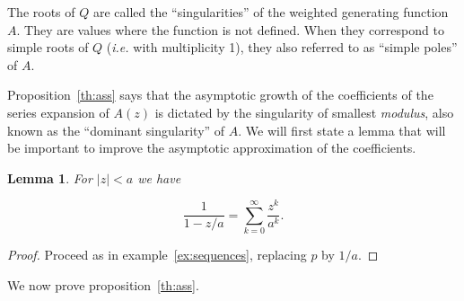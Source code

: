 \documentclass{article}
\newtheorem{lemma}{Lemma}
\begin{document}
The roots of $Q$ are called the ``singularities'' of the weighted
generating function $A$. They are values where the function is not
defined. When they correspond to simple roots of $Q$ (\textit{i.e.} with
multiplicity 1), they also referred to as ``simple poles'' of $A$.

Proposition~\ref{th:ass} says that the asymptotic growth of the
coefficients of the series expansion of $A(z)$ is dictated by the
singularity of smallest \textit{modulus}, also known as the ``dominant
singularity'' of $A$. We will first state a lemma that will be important
to improve the asymptotic approximation of the coefficients.

\begin{lemma}
\label{lemma:poles}
For $|z| < a$ we have

\begin{equation}
\label{eq:poles}
\frac{1}{1-z/a} = \sum_{k=0}^\infty \frac{z^k}{a^k}.
\end{equation}
\end{lemma}

\begin{proof}
Proceed as in example~\ref{ex:sequences}, replacing $p$ by $1/a$.
\end{proof}

We now prove proposition~\ref{th:ass}.
\end{document}

